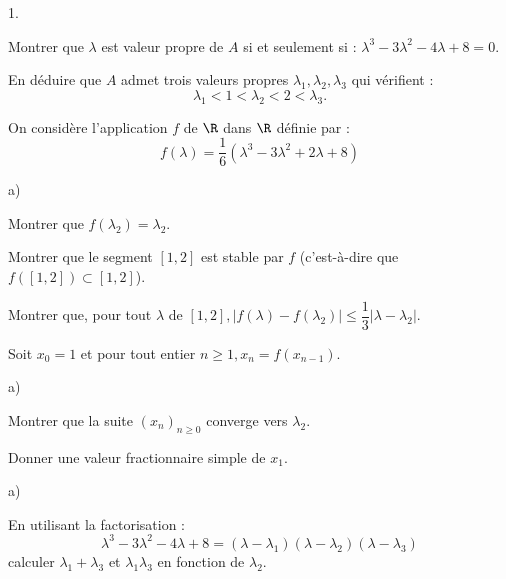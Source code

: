 \documentclass[11pt]{article}%
\begin{document}
\begin{noliste}{1.}
 \setlength{\itemsep}{4mm}
\item Montrer que $\lambda $ est valeur propre de $A$ si et seulement
si : $\lambda ^{3}-3\lambda ^{2}-4\lambda + 8 = 0.$

\item En déduire que $A$ admet trois valeurs propres
$\lambda_{1},\lambda
_{2},\lambda_{3}$ qui vérifient :
\[
\lambda_{1}<1<\lambda_{2}<2<\lambda_{3}.
\]

\item On considère l'application $f$ de $\R$ dans $\R$ définie par :
\[
f\left( \lambda \right) = \dfrac{1}{6}\left( \lambda ^{3}-3\lambda
^{2} + 2\lambda + 8\right)
\]

\begin{noliste}{a)}
 \setlength{\itemsep}{2mm}
\item Montrer que $f\left( \lambda_{2}\right) = \lambda_{2}.$

\item Montrer que le segment $\left[ 1,2\right] $ est stable par $f$
(c'est-à-dire que $f\left( \left[ 1,2\right] \right) \subset \left[
1,2\right] $).

\item Montrer que, pour tout $\lambda $ de $\left[ 1,2\right],\left|
f\left( \lambda \right) -f\left( \lambda_{2}\right) \right| \leq 
\dfrac{1}{3}\left| \lambda -\lambda_{2}\right|.$
\end{noliste}

\item Soit $x_{0} = 1$ et pour tout entier $n\geq 1,x_{n} = f\left(
x_{n-1}\right).$

\begin{noliste}{a)}
 \setlength{\itemsep}{2mm}
\item Montrer que la suite $\left( x_{n}\right)_{n\geq 0}$ converge
vers $\lambda_{2}.$

\item Donner une valeur fractionnaire simple de $x_{1}.$
\end{noliste}

\begin{noliste}{a)}
 \setlength{\itemsep}{2mm}
\item En utilisant la factorisation :
\[
\lambda ^{3}-3\lambda ^{2}-4\lambda + 8 = \left( \lambda
-\lambda_{1}\right)
\left( \lambda -\lambda_{2}\right) \left( \lambda -\lambda_{3}\right)
\]
calculer $\lambda_{1} + \lambda_{3}$ et $\lambda_{1}\lambda_{3}$ en
fonction de $\lambda_{2}.$


\end{noliste}
\end{noliste}
\end{document}
